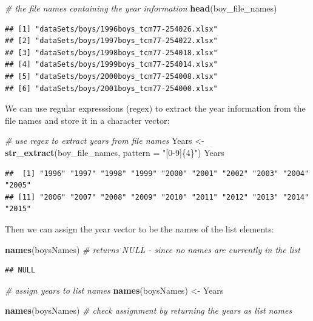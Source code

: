 \documentclass[
]{book}
\newenvironment{Shaded}{\begin{snugshade}}{\end{snugshade}}
\newcommand{\CommentTok}[1]{\textcolor[rgb]{0.56,0.35,0.01}{\textit{#1}}}
\newcommand{\DataTypeTok}[1]{\textcolor[rgb]{0.13,0.29,0.53}{#1}}
\newcommand{\KeywordTok}[1]{\textcolor[rgb]{0.13,0.29,0.53}{\textbf{#1}}}
\newcommand{\NormalTok}[1]{#1}
\newcommand{\StringTok}[1]{\textcolor[rgb]{0.31,0.60,0.02}{#1}}
\begin{document}
\begin{Shaded}
\begin{Highlighting}[]
\CommentTok{\# the file names containing the \textquotesingle{}year\textquotesingle{} information}
\KeywordTok{head}\NormalTok{(boy\_file\_names)}
\end{Highlighting}
\end{Shaded}

\begin{verbatim}
## [1] "dataSets/boys/1996boys_tcm77-254026.xlsx"
## [2] "dataSets/boys/1997boys_tcm77-254022.xlsx"
## [3] "dataSets/boys/1998boys_tcm77-254018.xlsx"
## [4] "dataSets/boys/1999boys_tcm77-254014.xlsx"
## [5] "dataSets/boys/2000boys_tcm77-254008.xlsx"
## [6] "dataSets/boys/2001boys_tcm77-254000.xlsx"
\end{verbatim}

We can use regular expresssions (regex) to extract the year information from the file names and store it in a character vector:

\begin{Shaded}
\begin{Highlighting}[]
\CommentTok{\# use regex to extract years from file names}
\NormalTok{Years \textless{}{-}}\StringTok{ }\KeywordTok{str\_extract}\NormalTok{(boy\_file\_names, }\DataTypeTok{pattern =} \StringTok{"[0{-}9]\{4\}"}\NormalTok{)}
\NormalTok{Years}
\end{Highlighting}
\end{Shaded}

\begin{verbatim}
##  [1] "1996" "1997" "1998" "1999" "2000" "2001" "2002" "2003" "2004" "2005"
## [11] "2006" "2007" "2008" "2009" "2010" "2011" "2012" "2013" "2014" "2015"
\end{verbatim}

Then we can assign the year vector to be the names of the list elements:

\begin{Shaded}
\begin{Highlighting}[]
\KeywordTok{names}\NormalTok{(boysNames) }\CommentTok{\# returns NULL {-} since no names are currently in the list}
\end{Highlighting}
\end{Shaded}

\begin{verbatim}
## NULL
\end{verbatim}

\begin{Shaded}
\begin{Highlighting}[]
\CommentTok{\# assign years to list names}
\KeywordTok{names}\NormalTok{(boysNames) \textless{}{-}}\StringTok{ }\NormalTok{Years }

\KeywordTok{names}\NormalTok{(boysNames) }\CommentTok{\# check assignment by returning the years as list names}
\end{Highlighting}
\end{Shaded}
\end{document}
